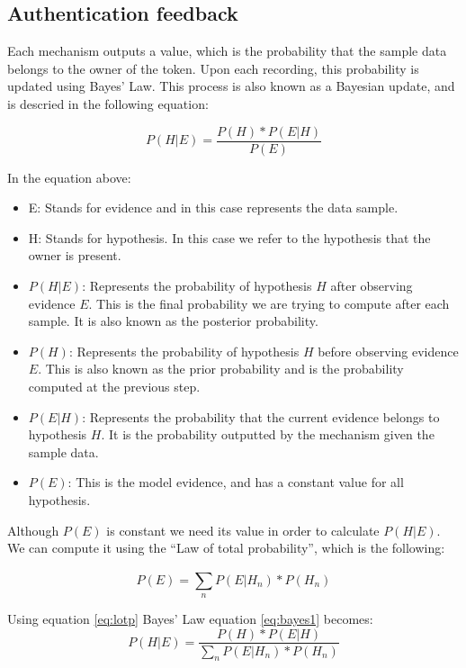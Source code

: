 \subsection*{Authentication feedback}
\label{authfeedback}
Each mechanism outputs a value, which is the probability that the sample data belongs to the owner of the token. Upon each recording, this probability is updated using Bayes' Law. This process is also known as a Bayesian update, and is descried in the following equation:

\begin{equation} 
\label{eq:bayes1}
P(H|E) = \frac{P(H) * P(E|H)}{P(E)}
\end{equation}

In the equation above:
\begin{itemize} 
	\item E: Stands for evidence and in this case represents the data sample.
	\item H: Stands for hypothesis. In this case we refer to the hypothesis that the owner is present.
	\item $P(H|E)$: Represents the probability of hypothesis $H$ after observing evidence $E$. This is the final probability we are trying to compute after each sample. It is also known as the posterior probability. 
	\item $P(H)$: Represents the probability of hypothesis $H$ before observing evidence $E$. This is also known as the prior probability and is the probability computed at the previous step.
	\item $P(E|H)$: Represents the probability that the current evidence belongs to hypothesis $H$. It is the probability outputted by the mechanism given the sample data.
	\item $P(E)$: This is the model evidence, and has a constant value for all hypothesis.
\end{itemize}

Although $P(E)$ is constant we need its value in order to calculate $P(H|E)$. We can compute it using the ``Law of total probability'', which is the following:

\begin{equation} 
\label{eq:lotp}
P(E) = \sum_{n}^{}P(E|H_n) * P(H_n)
\end{equation}

Using equation \ref{eq:lotp} Bayes' Law equation \ref{eq:bayes1} becomes:
\begin{equation} 
\label{eq:bayes2}
P(H|E) = \frac{P(H) * P(E|H)}{\sum_{n}^{}P(E|H_n) * P(H_n)}
\end{equation}

